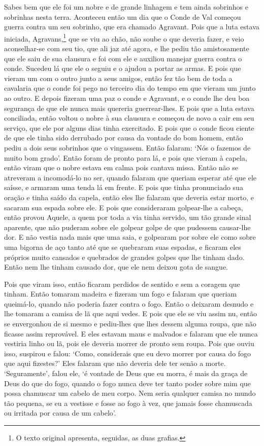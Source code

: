 Sabes bem que ele foi um nobre e de grande linhagem e tem ainda sobrinhos e
sobrinhas nesta terra. Aconteceu então um dia que o Conde de Val começou guerra
contra um seu sobrinho, que era chamado Agravant. Pois que a luta estava
iniciada, Agravans,\footnote{ O texto original apresenta, seguidas, as duas
grafias.}  que se viu ao chão, não soube o que deveria fazer, e
veio aconselhar-se com seu tio, que ali jaz até agora, e lhe pediu tão
amistosamente que ele saiu de sua clausura e foi com ele e auxiliou manejar
guerra contra o conde. Sucedeu lá que ele o seguiu e o ajudou a portar as
armas. E pois que vieram um com o outro junto a seus amigos, então fez tão bem
de toda a cavalaria que o conde foi pego no terceiro dia do tempo em que vieram
um junto ao outro. E depois fizeram uma paz o conde e Agravant, e o conde lhe
deu boa segurança de que ele nunca mais quereria guerrear-lhes. E pois que a
luta estava conciliada, então voltou o nobre à sua clausura e começou de novo a
cair em seu serviço, que ele por alguns dias tinha exercitado. E pois que o
conde ficou ciente de que ele tinha sido derrubado por causa da vontade do bom
homem, então pediu a dois seus sobrinhos que o vingassem. Então falaram: ‘Nós o
fazemos de muito bom grado’. Então foram de pronto para lá, e
pois que vieram à capela, então viram que o nobre estava em calma pois cantava
missa. Então não se atreveram a incomodá-lo no ser, quando falaram que queriam
esperar até que ele saísse, e armaram uma tenda lá em frente. E pois que tinha
pronunciado sua oração e tinha saído da capela, então eles lhe falaram que
deveria estar morto, e sacaram sua espada sobre ele. E pois que consideraram
golpear-lhe a cabeça, então provou Aquele, a quem por toda a via tinha servido,
um tão grande sinal aparente, que não puderam sobre ele golpear golpe de que
pudessem causar-lhe dor. E não vestia nada mais que uma saia, e
golpearam por sobre ele como sobre uma bigorna de aço tanto até que se
quebraram suas espadas, e ficaram eles próprios muito cansados e quebrados de
grandes golpes que lhe tinham dado. Então nem lhe tinham causado dor, que ele
nem deixou gota de sangue.

Pois que viram isso, então ficaram perdidos de sentido e sem a coragem que
tinham. Então tomaram madeira e fizeram um fogo e falaram que queriam
queimá-lo, quando não poderia fazer contra o fogo. Então o deixaram desnudo e
lhe tomaram a camisa de lã que aqui vedes. E pois que ele se viu assim nu,
então se envergonhou de si mesmo e pediu-lhes que lhes dessem alguma roupa, que
não ficasse assim reprovável. E eles estavam maus e malvados e falaram que ele
nunca vestiria linho ou lã, pois ele deveria morrer de pronto sem roupa. Pois
que ouviu isso, suspirou e falou: ‘Como, considerais que eu devo morrer por
causa do fogo que aqui fizestes?’ Eles falaram que não deveria dele ter senão
a morte. ‘Seguramente’, falou ele, ‘é vontade de Deus que eu morra, é mais da
graça de Deus do que do fogo, quando o fogo nunca deve ter tanto poder sobre
mim que possa chamuscar um cabelo de meu corpo. Nem seria qualquer camisa no
mundo tão pequena, se eu a vestisse e fosse ao fogo à vez, que jamais fosse
chamuscada ou irritada por causa de um cabelo’. 

